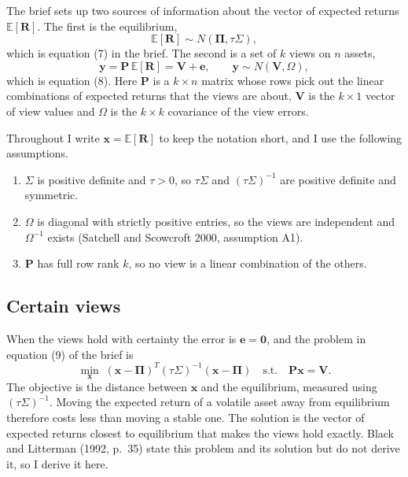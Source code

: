 \documentclass[11pt]{article}
\numberwithin{equation}{section}
\begin{document}
The brief sets up two sources of information about the vector of expected returns $\mathbb{E}[\bm{R}]$. The first is the equilibrium,
\begin{equation}
  \mathbb{E}[\bm{R}] \sim N\left(\bm{\Pi}, \tau\Sigma\right),
  \label{eq:q3-equilibrium}
\end{equation}
which is equation (7) in the brief. The second is a set of $k$ views on $n$ assets,
\begin{equation}
  \bm{y} = \bm{P}\,\mathbb{E}[\bm{R}] = \bm{V} + \bm{e}, \qquad \bm{y} \sim N\left(\bm{V}, \Omega\right),
  \label{eq:q3-views}
\end{equation}
which is equation (8). Here $\bm{P}$ is a $k \times n$ matrix whose rows pick out the linear combinations of expected returns that the views are about, $\bm{V}$ is the $k \times 1$ vector of view values and $\Omega$ is the $k \times k$ covariance of the view errors.

Throughout I write $\bm{x} = \mathbb{E}[\bm{R}]$ to keep the notation short, and I use the following assumptions.
\begin{enumerate}
  \item $\Sigma$ is positive definite and $\tau > 0$, so $\tau\Sigma$ and $(\tau\Sigma)^{-1}$ are positive definite and symmetric.
  \item $\Omega$ is diagonal with strictly positive entries, so the views are independent and $\Omega^{-1}$ exists (Satchell and Scowcroft 2000, assumption A1).
  \item $\bm{P}$ has full row rank $k$, so no view is a linear combination of the others.
\end{enumerate}

\subsection{Certain views}
\label{sec:q3-1}

When the views hold with certainty the error is $\bm{e} = \mathbf{0}$, and the problem in equation (9) of the brief is
\begin{equation}
  \min_{\bm{x}} \; \left(\bm{x} - \bm{\Pi}\right)^{T}(\tau\Sigma)^{-1}\left(\bm{x} - \bm{\Pi}\right) \quad \text{s.t.} \quad \bm{P}\bm{x} = \bm{V}.
  \label{eq:q3-certain-problem}
\end{equation}
The objective is the distance between $\bm{x}$ and the equilibrium, measured using $(\tau\Sigma)^{-1}$. Moving the expected return of a volatile asset away from equilibrium therefore costs less than moving a stable one. The solution is the vector of expected returns closest to equilibrium that makes the views hold exactly. Black and Litterman (1992, p.~35) state this problem and its solution but do not derive it, so I derive it here.
\end{document}
